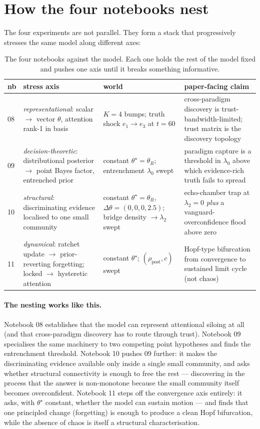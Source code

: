 \documentclass[11pt,a4paper]{article}
\theoremstyle{plain}
\begin{document}
\section{How the four notebooks nest}
\label{sec:nest}

The four experiments are not parallel. They form a stack that
progressively stresses the same model along different axes:

\begin{table}[h]
\centering
\renewcommand{\arraystretch}{1.15}
\begin{tabular}{@{}p{14mm}p{34mm}p{34mm}p{52mm}@{}}
\toprule
\textbf{nb} & \textbf{stress axis} & \textbf{world} & \textbf{paper-facing claim} \\
\midrule
08 & \emph{representational}: scalar $\to$ vector $\theta$, attention rank-1 in basis & $K=4$ bumps; truth shock $e_1\to e_3$ at $t=60$ & cross-paradigm discovery is trust-bandwidth-limited; trust matrix is the discovery topology \\
09 & \emph{decision-theoretic}: distributional posterior $\to$ point Bayes factor, entrenched prior & constant $\theta^\star=\theta_R$; entrenchment $\lambda_0$ swept & paradigm capture is a threshold in $\lambda_0$ above which evidence-rich truth fails to spread \\
10 & \emph{structural}: discriminating evidence localised to one small community & constant $\theta^\star=\theta_R$, $\Delta\theta=(0,0,0,2.5)$; bridge density $\to\lambda_2$ swept & echo-chamber trap at $\lambda_2{=}0$ \emph{plus} a vanguard-overconfidence flood above zero \\
11 & \emph{dynamical}: ratchet update $\to$ prior-reverting forgetting; locked $\to$ hysteretic attention & constant $\theta^\star$; $(\rho_{\text{post}}, c)$ swept & Hopf-type bifurcation from convergence to sustained limit cycle (not chaos) \\
\bottomrule
\end{tabular}
\caption{The four notebooks against the model. Each one holds the rest
of the model fixed and pushes one axis until it breaks something
informative.}
\label{tab:nest}
\end{table}

\paragraph{The nesting works like this.} Notebook 08 establishes that
the model can represent attentional siloing at all (and that
cross-paradigm discovery has to route through trust). Notebook 09
specialises the same machinery to two competing point hypotheses and
finds the entrenchment threshold. Notebook 10 pushes 09 further: it
makes the discriminating evidence available only inside a single small
community, and asks whether structural connectivity is enough to free
the rest --- discovering in the process that the answer is non-monotone
because the small community itself becomes overconfident. Notebook 11
steps off the convergence axis entirely: it asks, with $\theta^\star$
constant, whether the model can sustain motion --- and finds that one
principled change (forgetting) is enough to produce a clean Hopf
bifurcation, while the absence of chaos is itself a structural
characterisation.
\end{document}
